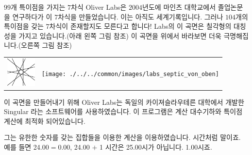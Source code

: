 \begin{surferPage}{$99$개 특이점을 가지는 $7$차식}
    Oliver Labs은 $2004$년도에 마인츠 대학교에서 졸업논문을 연구하다가 이 $7$차식을 만들었습니다. 이는 아직도 세계기록입니다. 그러나 $104$개의 특이점을 갖는 $7$차식이 존재할지도 모른다고 합니다! Labs의 이 곡면은 칠각형의 대칭성을 가지고 있습니다.(아래 왼쪽 그림 참조) 이 곡면을 위에서 바라보면 더욱 극명해집니다.(오른쪽 그림 참조) 

    \vspace*{-0.3em}
    \begin{center}
      \begin{tabular}{c@{\qquad}c}
        \includegraphics[height=1.5cm]{./../../common/images/labsseptic1.pdf}
        &
        \texttt{[image: ./../../common/images/labs\_septic\_von\_oben]}
      \end{tabular}
    \end{center}
    \vspace*{-0.3em}

이 곡면을 만들어내기 위해 Oliver Labs는 독일의 카이져슬라우테른 대학에서 개발한 {\sc Singular} 라는 소프트웨어를 사용하였습니다. 이 프로그램은 계산 대수기하와 특이점 계산에 최적화 되어있습니다. 

그는 유한한 숫자를 갖는 집합들을 이용한 계산을 이용하였습니다. 시간처럼 말이죠. 예를 들면 24.00$=$0.00, 24.00 $+$ 1 시간은 25.00시가 아닙니다. 1.00시죠.
\end{surferPage}
